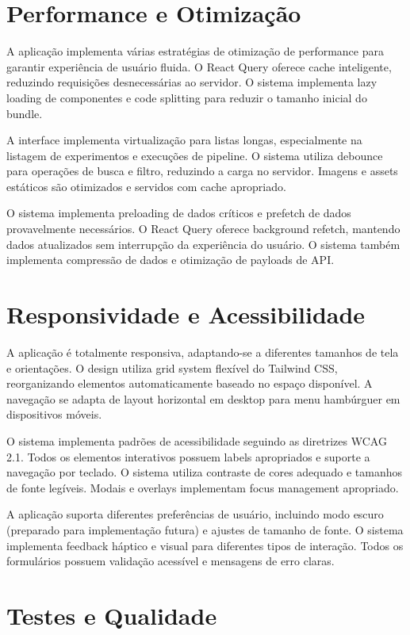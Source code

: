 \documentclass[12pt,a4paper]{article}
\begin{document}
\section{Performance e Otimização}

A aplicação implementa várias estratégias de otimização de performance para garantir experiência de usuário fluida. O React Query oferece cache inteligente, reduzindo requisições desnecessárias ao servidor. O sistema implementa lazy loading de componentes e code splitting para reduzir o tamanho inicial do bundle.

A interface implementa virtualização para listas longas, especialmente na listagem de experimentos e execuções de pipeline. O sistema utiliza debounce para operações de busca e filtro, reduzindo a carga no servidor. Imagens e assets estáticos são otimizados e servidos com cache apropriado.

O sistema implementa preloading de dados críticos e prefetch de dados provavelmente necessários. O React Query oferece background refetch, mantendo dados atualizados sem interrupção da experiência do usuário. O sistema também implementa compressão de dados e otimização de payloads de API.

\section{Responsividade e Acessibilidade}

A aplicação é totalmente responsiva, adaptando-se a diferentes tamanhos de tela e orientações. O design utiliza grid system flexível do Tailwind CSS, reorganizando elementos automaticamente baseado no espaço disponível. A navegação se adapta de layout horizontal em desktop para menu hambúrguer em dispositivos móveis.

O sistema implementa padrões de acessibilidade seguindo as diretrizes WCAG 2.1. Todos os elementos interativos possuem labels apropriados e suporte a navegação por teclado. O sistema utiliza contraste de cores adequado e tamanhos de fonte legíveis. Modais e overlays implementam focus management apropriado.

A aplicação suporta diferentes preferências de usuário, incluindo modo escuro (preparado para implementação futura) e ajustes de tamanho de fonte. O sistema implementa feedback háptico e visual para diferentes tipos de interação. Todos os formulários possuem validação acessível e mensagens de erro claras.

\section{Testes e Qualidade}
\end{document}
